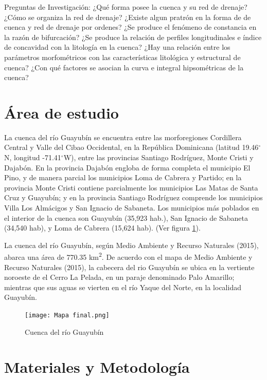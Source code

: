 \documentclass[11pt,]{article}
\begin{document}
Preguntas de Investigación: ¿Qué forma posee la cuenca y su red de
drenaje? ¿Cómo se organiza la red de drenaje? ¿Existe algun pratrón en
la forma de de cuenca y red de drenaje por ordenes? ¿Se produce el
fenómeno de constancia en la razón de bifurcación? ¿Se produce la
relación de perfiles longitudinales e índice de concavidad con la
litología en la cuenca? ¿Hay una relación entre los parámetros
morfométricos con las características litológica y estructural de
cuenca? ¿Con qué factores se asocian la curva e integral hipsométricas
de la cuenca?

\section{Área de estudio}\label{uxe1rea-de-estudio}

La cuenca del río Guayubín se encuentra entre las morforegiones
Cordillera Central y Valle del Cibao Occidental, en la República
Dominicana (latitud 19.46\(^\circ\)N, longitud -71.41\(^\circ\)W), entre
las provincias Santiago Rodríguez, Monte Cristi y Dajabón. En la
provincia Dajabón engloba de forma completa el municipio El Pino, y de
manera parcial los municipios Loma de Cabrera y Partido; en la provincia
Monte Cristi contiene parcialmente los municipios Las Matas de Santa
Cruz y Guayubín; y en la provincia Santiago Rodríguez comprende los
municipios Villa Los Almácigos y San Ignacio de Sabaneta. Los municipios
más poblados en el interior de la cuenca son Guayubín (35,923 hab.), San
Ignacio de Sabaneta (34,540 hab), y Loma de Cabrera (15,624 hab). (Ver
figura \ref {mapacuenca}).

La cuenca del río Guayubín, según Medio Ambiente y Recurso Naturales
(2015), abarca una área de 770.35 km\textsuperscript{2}. De acuerdo con
el mapa de Medio Ambiente y Recurso Naturales (2015), la cabecera del
rio Guayubín se ubica en la vertiente noroeste de el Cerro La Pelada, en
un paraje denominado Palo Amarillo; mientras que sus aguas se vierten en
el río Yaque del Norte, en la localidad Guayubín.

\begin{figure}
\centering
\texttt{[image: Mapa final.png]}
\caption{Cuenca del río Guayubín\label{mapacuenca}}
\end{figure}

\section{Materiales y Metodología}\label{materiales-y-metodologuxeda}
\end{document}
